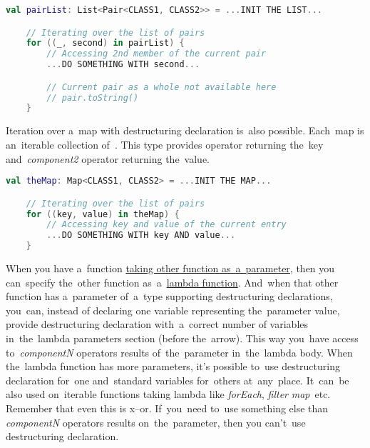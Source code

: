 \begin{lstlisting}[language=Kotlin]
    val pairList: List<Pair<CLASS1, CLASS2>> = ...INIT THE LIST...

    // Iterating over the list of pairs
    for ((_, second) in pairList) {
        // Accessing 2nd member of the current pair
        ...DO SOMETHING WITH second...

        // Current pair as a whole not available here
        // pair.toString()
    }
\end{lstlisting}
\newline

\noindent Iteration over a~map with destructuring declaration is~also possible.
Each~map is an~iterable collection \mbox{of }.
This type provides  operator returning the~key \mbox{and \textit{component2}} operator returning the~value.

\begin{lstlisting}[language=Kotlin]
    val theMap: Map<CLASS1, CLASS2> = ...INIT THE MAP...

    // Iterating over the list of pairs
    for ((key, value) in theMap) {
        // Accessing key and value of the current entry
        ...DO SOMETHING WITH key AND value...
    }
\end{lstlisting}

When you have a~function \hyperref[kotlinanonymousfunction]{taking other function as~a~parameter}, then you can~specify the~other function as~a~\hyperref[kotlinlambda]{lambda function}.
And~when that other function has a~parameter of~a~type supporting destructuring declarations, you~can, instead of declaring one variable representing the~parameter value, provide destructuring declaration with~a~correct number of variables in~the~lambda parameters section (before the~arrow).
This way you~have access \mbox{to \textit{componentN}} operators results of~the~parameter in~the~lambda body.
When the~lambda function has more parameters, it's possible to~use destructuring declaration for~one and~standard variables for~others at~any~place.
It~can~be also used on~iterable functions taking lambda like \mbox{\textit{forEach},} \mbox{\textit{filter}} \mbox{\textit{map} etc.}
Remember that even this is x--or.
If~you~need to~use something else than \textit{componentN} operators results on~the~parameter, then you can't~use destructuring declaration.

